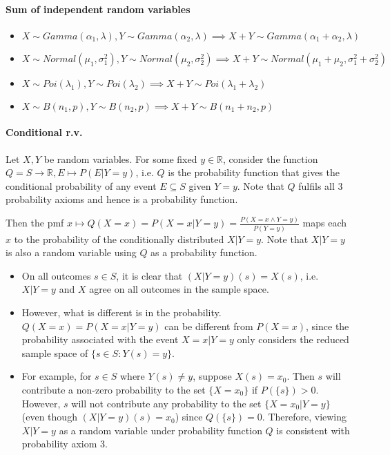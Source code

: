 \documentclass{article}
\begin{document}
\paragraph{Sum of independent random variables}
\begin{itemize}
	\item $X\sim Gamma(\alpha_1, \lambda), Y\sim Gamma(\alpha_2, \lambda)\implies X+Y\sim Gamma(\alpha_1 + \alpha_2, \lambda)$
	\item $X\sim Normal(\mu_1, \sigma_1^2), Y\sim Normal(\mu_2, \sigma_2^2)\implies X+Y\sim Normal(\mu_1 + \mu_2, \sigma_1^2 + \sigma_2^2)$
	\item $X\sim Poi(\lambda_1), Y\sim Poi(\lambda_2)\implies X+Y\sim Poi(\lambda_1+\lambda_2)$
	\item $X\sim B(n_1,p), Y\sim B(n_2,p)\implies X+Y\sim B(n_1+n_2,p)$
\end{itemize}

\paragraph{Conditional r.v.} Let $X, Y$ be random variables. For some fixed $y\in \mathbb{R}$, consider the function $Q = S\rightarrow \mathbb{R}, E\mapsto P(E | Y=y)$, i.e. $Q$ is the probability function that gives the conditional probability of any event $E\subseteq S$ given $Y=y$. Note that $Q$ fulfils all 3 probability axioms and hence is a probability function.

Then the pmf $x\mapsto Q(X=x) = P(X=x | Y=y) = \frac{P(X=x\land Y=y)}{P(Y=y)}$ maps each $x$ to the probability of the conditionally distributed $X|Y=y$. Note that $X|Y=y$ is also a random variable using $Q$ as a probability function.

\begin{itemize}
	\item On all outcomes $s\in S$, it is clear that $(X|Y=y)(s) = X(s)$, i.e. $X|Y=y$ and $X$ agree on all outcomes in the sample space.
	\item However, what is different is in the probability. $Q(X=x) = P(X=x|Y=y)$ can be different from $P(X=x)$, since the probability associated with the event $X=x|Y=y$ only considers the reduced sample space of $\{s\in S : Y(s) = y\}$.
	\item For example, for $s\in S$ where $Y(s)\neq y$, suppose $X(s) = x_0$. Then $s$ will contribute a non-zero probability to the set $\{X=x_0\}$ if $P(\{s\}) > 0$. However, $s$ will not contribute any probability to the set $\{X=x_0|Y=y\}$ (even though $(X|Y=y)(s) = x_0$) since $Q(\{s\}) = 0$. Therefore, viewing $X|Y=y$ as a random variable under probability function $Q$ is consistent with probability axiom 3.
\end{itemize}
\end{document}
